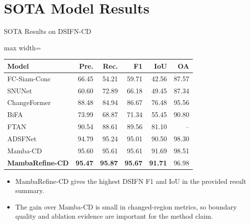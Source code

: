 \section{SOTA Model Results}

\begin{frame}{SOTA Results on DSIFN-CD}
    \centering
    \scriptsize
    \begin{adjustbox}{max width=\textwidth}
    \begin{tabular}{lrrrrr}
        \toprule
        \textbf{Model} & \textbf{Pre.} & \textbf{Rec.} & \textbf{F1} & \textbf{IoU} & \textbf{OA} \\
        \midrule
        FC-Siam-Conc & 66.45 & 54.21 & 59.71 & 42.56 & 87.57 \\
        SNUNet & 60.60 & 72.89 & 66.18 & 49.45 & 87.34 \\
        ChangeFormer & 88.48 & 84.94 & 86.67 & 76.48 & 95.56 \\
        BiFA & 73.99 & 68.87 & 71.34 & 55.45 & 90.80 \\
        FTAN & 90.54 & 88.61 & 89.56 & 81.10 & -- \\
        ADSFNet & 94.79 & 95.24 & 95.01 & 90.50 & 98.30 \\
        Mamba-CD & 95.60 & 95.61 & 95.61 & 91.69 & 98.51 \\
        \textbf{MambaRefine-CD} & \textbf{95.47} & \textbf{95.87} & \textbf{95.67} & \textbf{91.71} & 96.98 \\
        \bottomrule
    \end{tabular}
    \end{adjustbox}

    \vspace{0.8em}
    \small
    \begin{itemize}
        \item MambaRefine-CD gives the highest DSIFN F1 and IoU in the provided result summary.
        \item The gain over Mamba-CD is small in changed-region metrics, so boundary quality and ablation evidence are important for the method claim.
    \end{itemize}
\end{frame}

